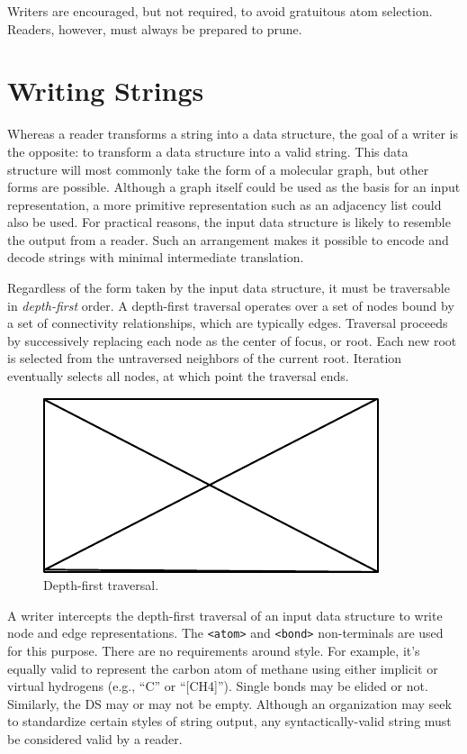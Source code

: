 \documentclass{article}
\def\ttt{\texttt}
\begin{document}
Writers are encouraged, but not required, to avoid gratuitous atom selection. Readers, however, must always be prepared to prune.

\section*{Writing Strings}

Whereas a reader transforms a string into a data structure, the goal of a writer is the opposite: to transform a data structure into a valid string. This data structure will most commonly take the form of a molecular graph, but other forms are possible. Although a graph itself could be used as the basis for an input representation, a more primitive representation such as an adjacency list could also be used. For practical reasons, the input data structure is likely to resemble the output from a reader. Such an arrangement makes it possible to encode and decode strings with minimal intermediate translation.

Regardless of the form taken by the input data structure, it must be traversable in \textit{depth-first} order. A depth-first traversal operates over a set of nodes bound by a set of connectivity relationships, which are typically edges. Traversal proceeds by successively replacing each node as the center of focus, or root. Each new root is selected from the untraversed neighbors of the current root. Iteration eventually selects all nodes, at which point the traversal ends.

\begin{figure}
    \centering
    \includegraphics{filler}
    \caption{Depth-first traversal.}
    \label{fig:depth-first-traversal}
\end{figure}

A writer intercepts the depth-first traversal of an input data structure to write node and edge representations. The \ttt{<atom>} and \ttt{<bond>} non-terminals are used for this purpose. There are no requirements around style. For example, it's equally valid to represent the carbon atom of methane using either implicit or virtual hydrogens (e.g., \enquote{C} or \enquote{[CH4]}). Single bonds may be elided or not. Similarly, the DS may or may not be empty. Although an organization may seek to standardize certain styles of string output, any syntactically-valid string must be considered valid by a reader.
\end{document}
